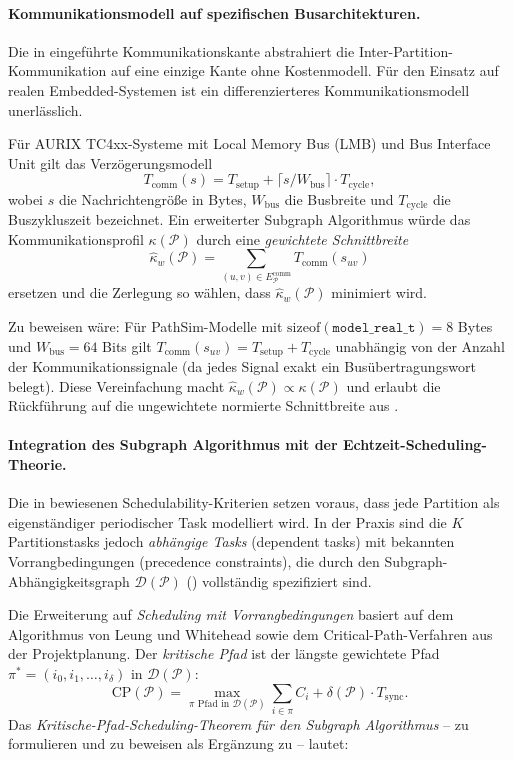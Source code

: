 ﻿\documentclass[12pt,a4paper]{article}
\theoremstyle{definition}
\begin{document}
\paragraph{Kommunikationsmodell auf spezifischen Busarchitekturen.}
Die in  eingeführte Kommunikationskante
abstrahiert die Inter-Partition-Kommunikation auf eine einzige
Kante ohne Kostenmodell. Für den Einsatz auf realen
Embedded-Systemen ist ein differenzierteres Kommunikationsmodell
unerlässlich.

Für AURIX TC4xx-Systeme mit Local Memory Bus (LMB) und
Bus Interface Unit gilt das Verzögerungsmodell
\[
  T_{\mathrm{comm}}(s) = T_{\mathrm{setup}} + \lceil s / W_{\mathrm{bus}} \rceil \cdot T_{\mathrm{cycle}},
\]
wobei $s$ die Nachrichtengröße in Bytes, $W_{\mathrm{bus}}$ die
Busbreite und $T_{\mathrm{cycle}}$ die Buszykluszeit bezeichnet.
Ein erweiterter Subgraph Algorithmus würde das
Kommunikationsprofil $\kappa(\mathcal{P})$ durch eine
\emph{gewichtete Schnittbreite}
\[
  \hat{\kappa}_w(\mathcal{P})
  = \sum_{(u,v) \in E_{\mathcal{P}}^{\mathrm{comm}}} T_{\mathrm{comm}}(s_{uv})
\]
ersetzen und die Zerlegung so wählen, dass $\hat{\kappa}_w(\mathcal{P})$
minimiert wird.

Zu beweisen wäre: Für PathSim-Modelle mit
$\mathrm{sizeof}(\texttt{model\_real\_t}) = 8$ Bytes und
$W_{\mathrm{bus}} = 64$ Bits gilt
$T_{\mathrm{comm}}(s_{uv}) = T_{\mathrm{setup}} + T_{\mathrm{cycle}}$
unabhängig von der Anzahl der Kommunikationssignale (da jedes Signal
exakt ein Busübertragungswort belegt). Diese Vereinfachung macht
$\hat{\kappa}_w(\mathcal{P}) \propto \kappa(\mathcal{P})$ und
erlaubt die Rückführung auf die ungewichtete normierte Schnittbreite
aus .

\paragraph{Integration des Subgraph Algorithmus mit der Echtzeit-Scheduling-Theorie.}
Die in  bewiesenen
Schedulability-Kriterien setzen voraus, dass jede Partition als
eigenständiger periodischer Task modelliert wird. In der Praxis
sind die $K$ Partitionstasks jedoch \emph{abhängige Tasks} (dependent
tasks) mit bekannten Vorrangbedingungen (precedence constraints),
die durch den Subgraph-Abhängigkeitsgraph $\mathcal{D}(\mathcal{P})$
() vollständig spezifiziert sind.

Die Erweiterung auf \emph{Scheduling mit Vorrangbedingungen}
basiert auf dem Algorithmus von Leung und Whitehead \cite{liu1973}
sowie dem Critical-Path-Verfahren aus der Projektplanung.
Der \emph{kritische Pfad} ist der längste gewichtete Pfad
$\pi^* = (i_0, i_1, \ldots, i_{\delta})$ in $\mathcal{D}(\mathcal{P})$:
\[
  \mathrm{CP}(\mathcal{P})
  = \max_{\pi \text{ Pfad in } \mathcal{D}(\mathcal{P})}
    \sum_{i \in \pi} C_i + \delta(\mathcal{P}) \cdot T_{\mathrm{sync}}.
\]
Das \emph{Kritische-Pfad-Scheduling-Theorem für den Subgraph Algorithmus}
-- zu formulieren und zu beweisen als Ergänzung zu
 -- lautet:
\end{document}
